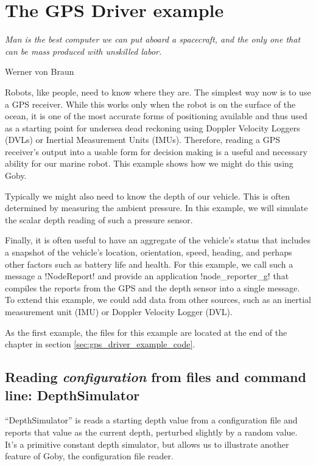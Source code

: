 \chapter{The GPS Driver example} \label{chap:gps_driver}
\MakeShortVerb{\!} %
\epigraph{\textit{Man is the best computer we can put aboard a spacecraft, and the only one that can be mass produced with unskilled labor.}}{Werner von Braun}

Robots, like people, need to know where they are. The simplest way now is to use a GPS receiver. While this works only when the robot is on the surface of the ocean, it is one of the most accurate forms of positioning available and thus used as a starting point for undersea dead reckoning using Doppler Velocity Loggers (DVLs) or Inertial Measurement Units (IMUs). Therefore, reading a GPS receiver's output into a usable form for decision making is a useful and necessary ability for our marine robot. This example shows how we might do this using Goby.

Typically we might also need to know the depth of our vehicle. This is often determined by measuring the ambient pressure. In this example, we will simulate the scalar depth reading of such a pressure sensor.

Finally, it is often useful to have an aggregate of the vehicle's status that includes a snapshot of the vehicle's location, orientation, speed, heading, and perhaps other factors such as battery life and health. For this example, we call such a message a !NodeReport! and provide an application !node_reporter_g! that compiles the reports from the GPS and the depth sensor into a single message. To extend this example, we could add data from other sources, such as an inertial measurement unit (IMU) or Doppler Velocity Logger (DVL).

As the first example, the files for this example are located at the end of the chapter in section \ref{sec:gps_driver_example_code}.

\section{Reading \textit{configuration} from files and command line: DepthSimulator}

``DepthSimulator'' is reads a starting depth value from a configuration file and reports that value as the current depth, perturbed slightly by a random value. It's a primitive constant depth simulator, but allows us to illustrate another feature of Goby, the configuration file reader.

